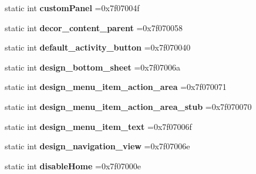 \begin{DoxyCompactItemize}
static int {\bfseries custom\+Panel} =0x7f07004f
\item 
\mbox{\label{classandroid_1_1support_1_1v7_1_1appcompat_1_1R_1_1id_a530fbe150315f5fbb27caed90cf9ac31}} 
static int {\bfseries decor\+\_\+content\+\_\+parent} =0x7f070058
\item 
\mbox{\label{classandroid_1_1support_1_1v7_1_1appcompat_1_1R_1_1id_aac3e4fc4166a9dd8ae65b43c129620e5}} 
static int {\bfseries default\+\_\+activity\+\_\+button} =0x7f070040
\item 
\mbox{\label{classandroid_1_1support_1_1v7_1_1appcompat_1_1R_1_1id_a4580e84c256fdb15c8133b246603c54a}} 
static int {\bfseries design\+\_\+bottom\+\_\+sheet} =0x7f07006a
\item 
\mbox{\label{classandroid_1_1support_1_1v7_1_1appcompat_1_1R_1_1id_a61c9d1effb00b409859bb6c38be0b426}} 
static int {\bfseries design\+\_\+menu\+\_\+item\+\_\+action\+\_\+area} =0x7f070071
\item 
\mbox{\label{classandroid_1_1support_1_1v7_1_1appcompat_1_1R_1_1id_af9ad49a7878880655509ca5cf46f69d2}} 
static int {\bfseries design\+\_\+menu\+\_\+item\+\_\+action\+\_\+area\+\_\+stub} =0x7f070070
\item 
\mbox{\label{classandroid_1_1support_1_1v7_1_1appcompat_1_1R_1_1id_a1b062113492e55217b6873a70a630d96}} 
static int {\bfseries design\+\_\+menu\+\_\+item\+\_\+text} =0x7f07006f
\item 
\mbox{\label{classandroid_1_1support_1_1v7_1_1appcompat_1_1R_1_1id_a8410a9810d876c8487d652a281b94e7e}} 
static int {\bfseries design\+\_\+navigation\+\_\+view} =0x7f07006e
\item 
\mbox{\label{classandroid_1_1support_1_1v7_1_1appcompat_1_1R_1_1id_af72bbeafc001e681732782d23fe2cf77}} 
static int {\bfseries disable\+Home} =0x7f07000e

\end{DoxyCompactItemize}
